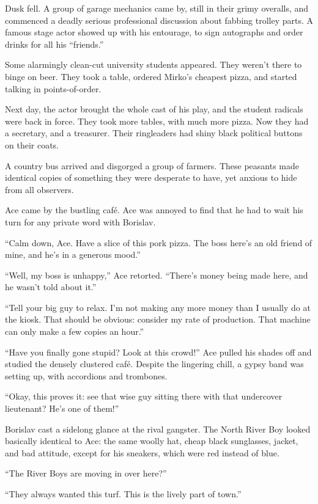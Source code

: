 \documentclass[20 pt,twoside,extrafontsizes,final]{memoir}
\begin{document}
Dusk fell. A group of garage mechanics came by, still in their grimy overalls, and commenced a deadly serious professional discussion about fabbing trolley parts. A famous stage actor showed up with his entourage, to sign autographs and order drinks for all his ``friends.''

Some alarmingly clean-cut university students appeared. They weren't there to binge on beer. They took a table, ordered Mirko's cheapest pizza, and started talking in points-of-order.

Next day, the actor brought the whole cast of his play, and the student radicals were back in force. They took more tables, with much more pizza. Now they had a secretary, and a treasurer. Their ringleaders had shiny black political buttons on their coats.

A country bus arrived and disgorged a group of farmers. These peasants made identical copies of something they were desperate to have, yet anxious to hide from all observers.

Ace came by the bustling caf\'e. Ace was annoyed to find that he had to wait his turn for any private word with Borislav.

``Calm down, Ace. Have a slice of this pork pizza. The boss here's an old friend of mine, and he's in a generous mood.''

``Well, my boss is unhappy,'' Ace retorted. ``There's money being made here, and he wasn't told about it.''

``Tell your big guy to relax. I'm not making any more money than I usually do at the kiosk. That should be obvious: consider my rate of production. That machine can only make a few copies an hour.''

``Have you finally gone stupid? Look at this crowd!'' Ace pulled his shades off and studied the densely clustered caf\'e. Despite the lingering chill, a gypsy band was setting up, with accordions and trombones.

``Okay, this proves it: see that wise guy sitting there with that undercover lieutenant? He's one of them!''

Borislav cast a sidelong glance at the rival gangster. The North River Boy looked basically identical to Ace: the same woolly hat, cheap black sunglasses, jacket, and bad attitude, except for his sneakers, which were red instead of blue.

``The River Boys are moving in over here?''

``They always wanted this turf. This is the lively part of town.''
\end{document}
